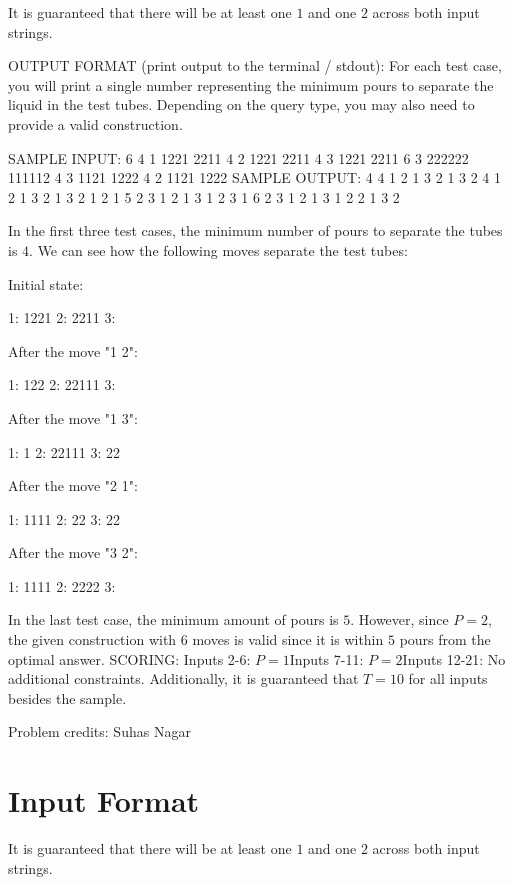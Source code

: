 \documentclass[12pt]{article}
\begin{document}
It is guaranteed that there will be at least one $1$ and one $2$ across both
input strings.

OUTPUT FORMAT (print output to the terminal / stdout):
For each test case, you will print a single number representing the minimum
pours to separate the liquid in the test tubes. Depending on the query type, you
may also need to provide a valid construction.

SAMPLE INPUT:
6
4 1
1221
2211
4 2
1221
2211
4 3
1221
2211
6 3
222222
111112
4 3
1121
1222
4 2
1121
1222
SAMPLE OUTPUT: 
4
4
1 2
1 3
2 1
3 2
4
1 2
1 3
2 1
3 2
1
2 1
5
2 3
1 2
1 3
1 2
3 1
6
2 3
1 2
1 3
1 2
2 1
3 2

In the first three test cases, the minimum number of pours to separate the tubes
is $4$. We can see how the following moves separate the test tubes:

Initial state:

1: 1221
2: 2211
3: 

After the move "1 2":

1: 122
2: 22111
3: 

After the move "1 3":

1: 1
2: 22111
3: 22

After the move "2 1":

1: 1111
2: 22
3: 22

After the move "3 2":

1: 1111
2: 2222
3:

In the last test case, the minimum amount of pours is $5$. However, since $P=2$,
the given construction with $6$ moves is valid since it is within $5$ pours from
the optimal answer.
SCORING:
Inputs 2-6: $P = 1$Inputs 7-11: $P=2$Inputs 12-21: No additional constraints.
Additionally, it is guaranteed that $T=10$ for all inputs besides the sample.


Problem credits: Suhas Nagar



\section*{Input Format}
It is guaranteed that there will be at least one $1$ and one $2$ across both
input strings.
\end{document}
